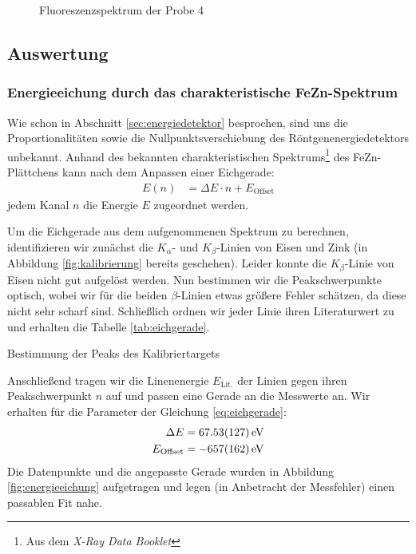 \documentclass[11pt, a4paper]{article}
\begin{document}
\begin{figure}[!h]
\centering

\caption{Fluoreszenzspektrum der Probe 4}
\label{fig:probe4}
\end{figure}

\FloatBarrier

\subsection{Auswertung}
\subsubsection{Energieeichung durch das charakteristische FeZn-Spektrum}
Wie schon in Abschnitt \ref{sec:energiedetektor} besprochen, sind uns die Proportionalitäten sowie die Nullpunktsverschiebung des Röntgenenergiedetektors unbekannt.
Anhand des bekannten charakteristischen Spektrums\footnote{Aus dem \emph{X-Ray Data Booklet}\cite{booklet}} des FeZn-Plättchens kann nach dem Anpassen einer Eichgerade:
\begin{align}
  E(n) &= \Delta E \cdot n + E_\mathrm{Offset}
  \label{eq:eichgerade}
\end{align}
jedem Kanal $n$ die Energie $E$ zugeordnet werden.

Um die Eichgerade aus dem aufgenommenen Spektrum zu berechnen, identifizieren wir zunächst die $K_\alpha$- und $K_\beta$-Linien von Eisen und Zink (in Abbildung \ref{fig:kalibrierung} bereits geschehen).
Leider konnte die $K_\beta$-Linie von Eisen nicht gut aufgelöst werden.
Nun bestimmen wir die Peakschwerpunkte optisch, wobei wir für die beiden $\beta$-Linien etwas größere Fehler schätzen, da diese nicht sehr scharf sind.
Schließlich ordnen wir jeder Linie ihren Literaturwert zu und erhalten die Tabelle \ref{tab:eichgerade}.
\begin{table}[h]
\centering

\caption{Bestimmung der Peaks des Kalibriertargets}
\label{tab:eichgerade}
\end{table}

Anschließend tragen wir die Linenenergie $E_\mathrm{Lit.}$ der Linien gegen ihren Peakschwerpunkt $n$ auf und passen eine Gerade an die Messwerte an.
Wir erhalten für die Parameter der Gleichung \ref{eq:eichgerade}:
\begin{align}
  \Delta E &= \SI{67,53 +- 1,27}{\electronvolt}\\
  E_\mathrm{Offset} &= \SI{-657 +- 162}{\electronvolt}
\end{align}
Die Datenpunkte und die angepasste Gerade wurden in Abbildung \ref{fig:energieeichung} aufgetragen und legen (in Anbetracht der Messfehler) einen passablen Fit nahe.
\end{document}
